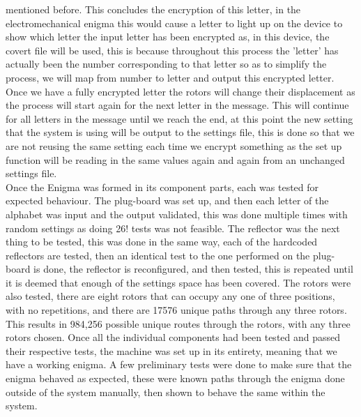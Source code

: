 \documentclass[12pt,a4paper]{article}
\begin{document}
mentioned before. This concludes the encryption of this letter, in the electromechanical enigma this would cause a letter to light up on the device to show which letter the input letter has been encrypted as, in this device, the covert file will be used, this is because throughout this process the 'letter' has actually been the number corresponding to that letter so as to simplify the process, we will map from number to letter and output this encrypted letter. Once we have a fully encrypted letter the rotors will change their displacement as the process will start again for the next letter in the message. This will continue for all letters in the message until we reach the end, at this point the new setting that the system is using will be output to the settings file, this is done so that we are not reusing the same setting each time we encrypt something as the set up function will be reading in the same values again and again from an unchanged settings file.\\

Once the Enigma was formed in its component parts, each was tested for expected behaviour. The plug-board was set up, and then each letter of the alphabet was input and the output validated, this was done multiple times with random settings as doing 26! tests was not feasible. The reflector was the next thing to be tested, this was done in the same way, each of the hardcoded reflectors are tested, then an identical test to the one performed on the plug-board is done, the reflector is reconfigured, and then tested, this is repeated until it is deemed that enough of the settings space has been covered. The rotors were also tested, there are eight rotors that can occupy any one of three positions, with no repetitions, and there are 17576 unique paths through any three rotors. This results in 984,256 possible unique routes through the rotors, with any three rotors chosen. Once all the individual components had been tested and passed their respective tests, the machine was set up in its entirety, meaning that we have a working enigma. A few preliminary tests were done to make sure that the enigma behaved as expected, these were known paths through the enigma done outside of the system manually, then shown to behave the same within the system.\\
\end{document}
